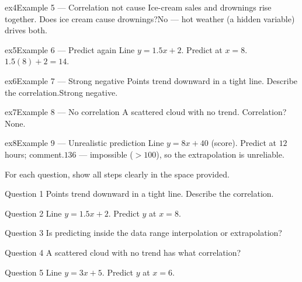 \documentclass[11pt]{article}
\begin{document}
\begin{example}{ex4}{Example 5 --- Correlation not cause}
Ice-cream sales and drownings rise together. Does ice cream cause drownings?\soln No — hot weather (a hidden variable) drives both.
\end{example}

\begin{example}{ex5}{Example 6 --- Predict again}
Line $y=1.5x+2$. Predict at $x=8$.\soln $1.5(8)+2=14$.
\end{example}

\begin{example}{ex6}{Example 7 --- Strong negative}
Points trend downward in a tight line. Describe the correlation.\soln Strong negative.
\end{example}

\begin{example}{ex7}{Example 8 --- No correlation}
A scattered cloud with no trend. Correlation?\soln None.
\end{example}

\begin{example}{ex8}{Example 9 --- Unrealistic prediction}
Line $y=8x+40$ (score). Predict at $12$ hours; comment.\soln $136$ — impossible ($>100$), so the extrapolation is unreliable.
\end{example}

\clearpage
{}
For each question, show all steps clearly in the space provided.

\begin{qbox}{Question 1}
Points trend downward in a tight line. Describe the correlation.\workspace{2.4cm}
\end{qbox}

\begin{qbox}{Question 2}
Line $y=1.5x+2$. Predict $y$ at $x=8$.\workspace{2.4cm}
\end{qbox}

\begin{qbox}{Question 3}
Is predicting inside the data range interpolation or extrapolation?\workspace{2.4cm}
\end{qbox}

\begin{qbox}{Question 4}
A scattered cloud with no trend has what correlation?\workspace{2.4cm}
\end{qbox}

\begin{qbox}{Question 5}
Line $y=3x+5$. Predict $y$ at $x=6$.\workspace{2.4cm}
\end{qbox}
\end{document}
